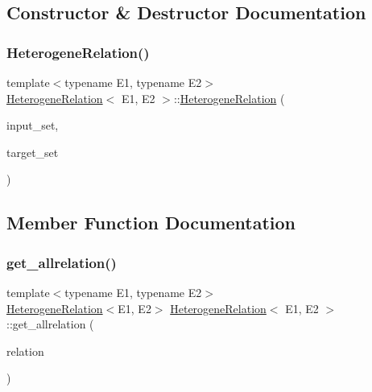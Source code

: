 \subsection{Constructor \& Destructor Documentation}
\mbox{\label{classHeterogeneRelation_ae52386d0704e75fe637e248177f3c115}} 
\subsubsection{\texorpdfstring{Heterogene\+Relation()}{HeterogeneRelation()}}
{\footnotesize\ttfamily template$<$typename E1, typename E2$>$ \\
\hyperlink{classHeterogeneRelation}{Heterogene\+Relation}$<$ E1, E2 $>$\+::\hyperlink{classHeterogeneRelation}{Heterogene\+Relation} (\begin{DoxyParamCaption}\item[{const E1 \&}]{input\+\_\+set,  }\item[{const E2 $\ast$}]{target\+\_\+set }\end{DoxyParamCaption})\hspace{0.3cm}{\ttfamily [inline]}}



\subsection{Member Function Documentation}
\mbox{\label{classHeterogeneRelation_ad96994e87bceb98db4bc2c3ae5c5d93a}} 
\subsubsection{\texorpdfstring{get\+\_\+allrelation()}{get\_allrelation()}}
{\footnotesize\ttfamily template$<$typename E1, typename E2$>$ \\
\hyperlink{classHeterogeneRelation}{Heterogene\+Relation}$<$E1, E2$>$ \hyperlink{classHeterogeneRelation}{Heterogene\+Relation}$<$ E1, E2 $>$\+::get\+\_\+allrelation (\begin{DoxyParamCaption}\item[{const \hyperlink{classHeterogeneRelation}{Heterogene\+Relation}$<$ E1, E2 $>$ \&}]{relation }\end{DoxyParamCaption})\hspace{0.3cm}{\ttfamily [inline]}}


